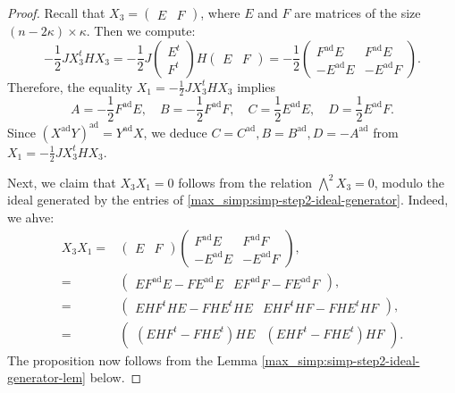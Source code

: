 \documentclass[pdflatex,sn-mathphys-num]{sn-jnl}%
\theoremstyle{thmstyleone}%
\theoremstyle{thmstyletwo}%
\numberwithin{equation}{subsection}
\theoremstyle{thmstylethree}%
\newcommand{\ad}{\mathrm{ad}}
\begin{document}
\begin{proof}
Recall that $X_3=\left(\begin{matrix}E&F\end{matrix}\right)$, where $E$ and $F$ are matrices of the size $(n-2\kappa)\times \kappa$. Then we compute:
\begin{equation*}
	-\frac{1}{2}JX_3^tHX_3=-\frac{1}{2}J\left(\begin{matrix}E^t\\F^t\end{matrix}\right)H\left(\begin{matrix}E&F\end{matrix}\right)
	=-\frac{1}{2}\left(\begin{matrix}F^{\ad}E&F^{\ad}E\\-E^{\ad}E&-E^{\ad}F\end{matrix}\right).
\end{equation*}
Therefore, the equality $X_1=-\frac{1}{2}JX_3^tHX_3$ implies
\begin{equation*}
	A=-\frac{1}{2}F^{\ad}E,\quad B=-\frac{1}{2}F^{\ad}F, \quad C=\frac{1}{2}E^{\ad}E,\quad D=\frac{1}{2}E^{\ad}F.
\end{equation*}
Since $(X^{\ad}Y)^{\ad}=Y^{\ad}X$, we deduce $C=C^{\ad},B=B^{\ad},D=-A^{\ad}$ from $X_1=-\frac{1}{2}JX_3^tHX_3$.
	
Next, we claim that $X_3X_1=0$ follows from the relation $\bigwedge^2 X_3=0$, modulo the ideal generated by the entries of \eqref{max_simp:simp-step2-ideal-generator}. Indeed, we ahve:
\begin{align*}
	X_3X_1={}&\left(\begin{matrix}E&F\end{matrix}\right)\left(\begin{matrix}F^{\ad}E&F^{\ad}F\\-E^{\ad}E&-E^{\ad}F\end{matrix}\right),\\
	={}&\left(\begin{matrix}EF^{\ad}E-FE^{\ad}E&EF^{\ad}F-FE^{\ad}F\end{matrix}\right),\\
	={}&\left(\begin{matrix}
		EHF^tHE-FHE^tHE&
		EHF^tHF-FHE^tHF
	\end{matrix}\right),\\
	={}&\left(\begin{matrix}
		(EHF^t-FHE^t)HE&
		(EHF^t-FHE^t)HF
	\end{matrix}\right).
\end{align*}
The proposition now follows from the Lemma \ref{max_simp:simp-step2-ideal-generator-lem} below.
\end{proof}
\end{document}
